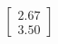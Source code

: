 \documentclass[preview]{standalone}
\begin{document}
\begin{align*}
\begin{bmatrix} 2.67 \\ 3.50 \end{bmatrix}
\end{align*}
\end{document}
